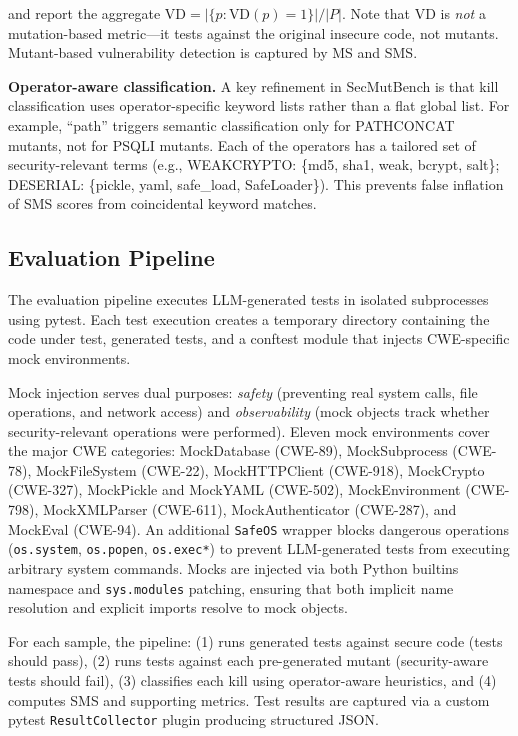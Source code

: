 \documentclass[sigconf,anonymous,review]{acmart}
\begin{document}
\noindent and report the aggregate $\text{VD} = |\{p : \text{VD}(p) = 1\}| / |P|$. Note that VD is \emph{not} a mutation-based metric---it tests against the original insecure code, not mutants. Mutant-based vulnerability detection is captured by MS and SMS.

\textbf{Operator-aware classification.} A key refinement in SecMutBench is that kill classification uses operator-specific keyword lists rather than a flat global list. For example, ``path'' triggers semantic classification only for \textsc{PATHCONCAT} mutants, not for \textsc{PSQLI} mutants. Each of the  operators has a tailored set of security-relevant terms (e.g., \textsc{WEAKCRYPTO}: \{md5, sha1, weak, bcrypt, salt\}; \textsc{DESERIAL}: \{pickle, yaml, safe\_load, SafeLoader\}). This prevents false inflation of SMS scores from coincidental keyword matches. 


\subsection{Evaluation Pipeline}

The evaluation pipeline executes LLM-generated tests in isolated subprocesses using pytest. Each test execution creates a temporary directory containing the code under test, generated tests, and a conftest module that injects CWE-specific mock environments.

Mock injection serves dual purposes: \emph{safety} (preventing real system calls, file operations, and network access) and \emph{observability} (mock objects track whether security-relevant operations were performed). Eleven mock environments cover the major CWE categories: MockDatabase (CWE-89), MockSubprocess (CWE-78), MockFileSystem (CWE-22), MockHTTPClient (CWE-918), MockCrypto (CWE-327), MockPickle and MockYAML (CWE-502), MockEnvironment (CWE-798), MockXMLParser (CWE-611), MockAuthenticator (CWE-287), and MockEval (CWE-94). An additional \texttt{SafeOS} wrapper blocks dangerous operations (\texttt{os.system}, \texttt{os.popen}, \texttt{os.exec*}) to prevent LLM-generated tests from executing arbitrary system commands. Mocks are injected via both Python builtins namespace and \texttt{sys.modules} patching, ensuring that both implicit name resolution and explicit imports resolve to mock objects.

For each sample, the pipeline: (1) runs generated tests against secure code (tests should pass), (2) runs tests against each pre-generated mutant (security-aware tests should fail), (3) classifies each kill using operator-aware heuristics, and (4) computes SMS and supporting metrics. Test results are captured via a custom pytest \texttt{ResultCollector} plugin producing structured JSON.
\end{document}
